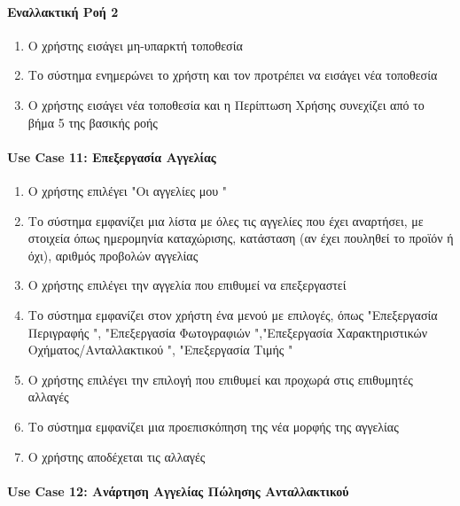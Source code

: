 \documentclass{../ol-softwaremanual}
\begin{document}
\paragraph{Εναλλακτική Ροή 2}
\begin{enumerate}
	\item Ο χρήστης εισάγει μη-υπαρκτή τοποθεσία
	\item Το σύστημα ενημερώνει το χρήστη και τον προτρέπει να εισάγει νέα τοποθεσία 
	\item Ο χρήστης εισάγει νέα τοποθεσία και η Περίπτωση Χρήσης συνεχίζει από το βήμα 5 της βασικής ροής
\end{enumerate}




	\paragraph{\en Use Case 11: \gr Επεξεργασία Αγγελίας \gr}

	\begin{enumerate}
		\item Ο χρήστης επιλέγει \en"\gr Οι αγγελίες μου \en"\gr
		\item Το σύστημα εμφανίζει μια λίστα με όλες τις αγγελίες που έχει αναρτήσει, με στοιχεία όπως ημερομηνία καταχώρισης, κατάσταση (αν έχει πουληθεί το προϊόν ή όχι), αριθμός προβολών αγγελίας
		\item Ο χρήστης επιλέγει την αγγελία που επιθυμεί να επεξεργαστεί
		\item Το σύστημα εμφανίζει στον χρήστη ένα μενού με επιλογές, όπως \en"\gr Επεξεργασία Περιγραφής \en"\gr , \en"\gr Επεξεργασία Φωτογραφιών \en"\gr,\en"\gr Επεξεργασία Χαρακτηριστικών Οχήματος/Ανταλλακτικού \en"\gr, \en"\gr Επεξεργασία Τιμής \en"\gr
		\item Ο χρήστης επιλέγει την επιλογή που επιθυμεί και προχωρά στις επιθυμητές αλλαγές
		\item Το σύστημα εμφανίζει μια προεπισκόπηση της νέα μορφής της αγγελίας
		\item Ο χρήστης αποδέχεται τις αλλαγές
	\end{enumerate}

	\paragraph{\en Use Case 12: \gr Ανάρτηση Αγγελίας Πώλησης Ανταλλακτικού \gr}
\end{document}
